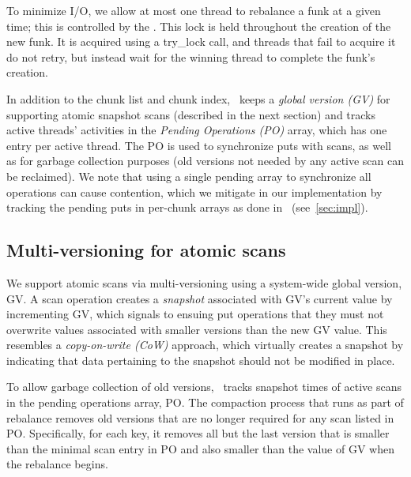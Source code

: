 To minimize I/O, we allow at most one thread to rebalance a funk at a given time; this is controlled by 
the  . 
This lock is held throughout the creation of the new funk. 
It is acquired using a try\_lock call, and threads that fail to acquire it do not retry, but instead wait for the winning thread to complete the funk's creation.

In addition to the chunk list and chunk index, \sys\ keeps a \emph{global version (GV)} for supporting atomic snapshot scans (described in the next section) and tracks active threads' activities in the 
\emph{Pending Operations (PO)} array, which has one entry per active thread. 
The PO is used to synchronize puts with scans, as well as for  garbage collection purposes (old 
versions not needed by any active scan can be reclaimed).
We note that using a single pending array to synchronize all operations can cause contention, which we
mitigate in our implementation by tracking the pending puts in per-chunk arrays as done in~\cite{kiwi} (see~\cref{sec:impl}). 

\subsection{Multi-versioning for atomic scans}
\label{ssec:scans}


We support atomic scans via multi-versioning using a system-wide global version, GV. 
A scan operation creates a \emph{snapshot} associated with GV's current value by incrementing GV, 
which signals to ensuing put operations that they must not overwrite values associated with 
smaller versions than the new GV value.
This resembles a \emph{copy-on-write (CoW)} approach, which virtually creates a snapshot by 
indicating that data pertaining to the snapshot should not be modified in place.  

To allow garbage collection of old versions, \sys\  tracks snapshot times of 
active scans in the pending operations array, PO.
The compaction process that runs as part of rebalance removes old versions that are no longer required for any  
scan listed in PO. Specifically, for each key, it removes all but the last version that is smaller than the minimal
scan entry in PO and also smaller than the value of GV when the rebalance begins. 

